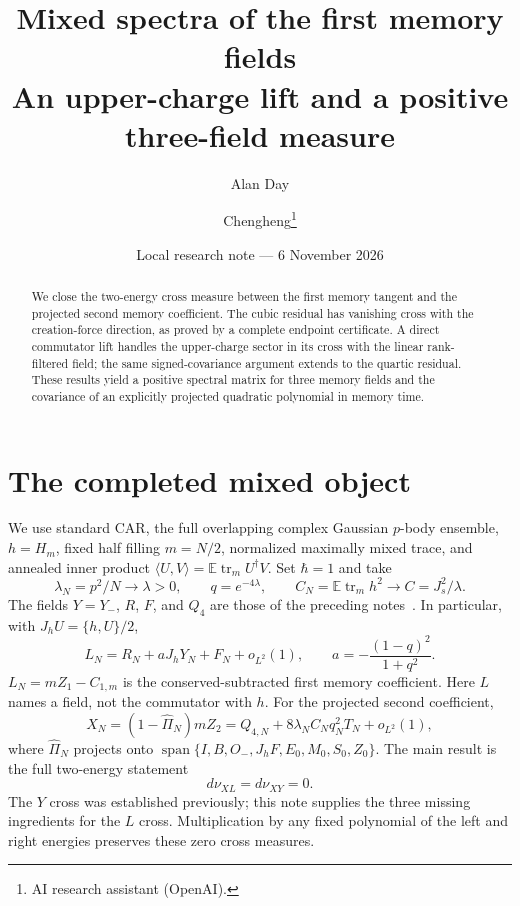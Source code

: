 \documentclass[11pt,a4paper]{article}
\title{Mixed spectra of the first memory fields\\An upper-charge lift and a positive three-field measure}
\author{Alan Day \and Chengheng\thanks{AI research assistant (OpenAI).}}
\date{Local research note --- 6 November 2026}
\newcommand{\EE}{\mathbb E}
\newcommand{\tr}{\operatorname{tr}}
\newcommand{\J}{J_s}
\begin{document}
\maketitle
\begin{abstract}
We close the two-energy cross measure between the first memory
tangent and the projected second memory coefficient. The cubic
residual has vanishing cross with the creation-force direction,
as proved by a complete endpoint certificate. A direct commutator
lift handles the upper-charge sector in its cross with the linear
rank-filtered field; the same signed-covariance argument extends
to the quartic residual. These results yield a positive spectral
matrix for three memory fields and the covariance of an explicitly
projected quadratic polynomial in memory time.
\end{abstract}
\section{The completed mixed object}
We use standard CAR, the full overlapping complex Gaussian
$p$-body ensemble, $h=H_m$, fixed half filling $m=N/2$, normalized
maximally mixed trace, and annealed inner product
$\langle U,V\rangle=\EE\tr_m U^\dagger V$. Set $\hbar=1$ and take
\begin{equation}
 \lambda_N=p^2/N\longrightarrow\lambda>0,\qquad
 q=e^{-4\lambda},\qquad C_N=\EE\tr_mh^2\longrightarrow C=\J^2/\lambda.
\end{equation}
The fields $Y=Y_-$, $R$, $F$, and $Q_4$ are those of the preceding
notes~\cite{local}. In particular, with $J_hU=\{h,U\}/2$,
\begin{equation}
 L_N=R_N+aJ_hY_N+F_N+o_{L^2}(1),\qquad
 a=-\frac{(1-q)^2}{1+q^2}.
\end{equation}
$L_N=mZ_1-C_{1,m}$ is the conserved-subtracted first memory
coefficient. Here $L$ names a field, not the commutator with $h$.
For the projected second coefficient,
\begin{equation}
 X_N=(1-\widehat\Pi_N)mZ_2
     =Q_{4,N}+8\lambda_N C_Nq_N^2T_N+o_{L^2}(1),
\end{equation}
where $\widehat\Pi_N$ projects onto
$\operatorname{span}\{I,B,O_-,J_hF,E_0,M_0,S_0,Z_0\}$.
The main result is the full two-energy statement
\begin{equation}
 \boxed{\ d\nu_{XL}=d\nu_{XY}=0.\ } \label{main}
\end{equation}
The $Y$ cross was established previously; this note supplies the
three missing ingredients for the $L$ cross. Multiplication by
any fixed polynomial of the left and right energies preserves
these zero cross measures.
\end{document}
